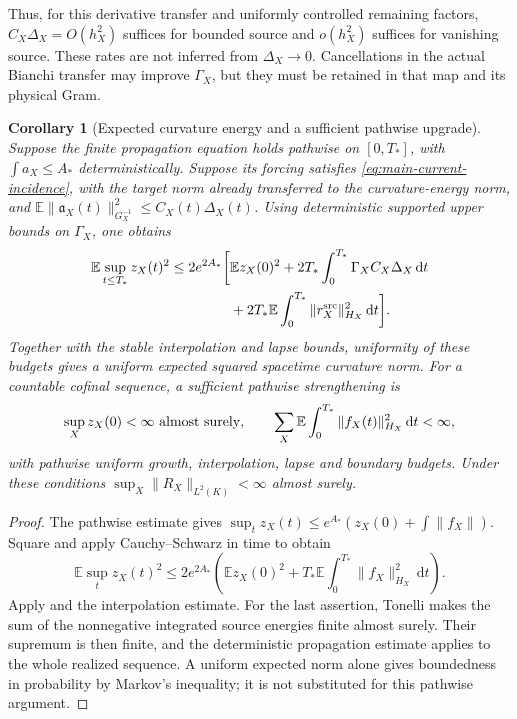 \documentclass[11pt]{article}
\numberwithin{equation}{section}
\newtheorem{corollary}[corollary]{Corollary}
\theoremstyle{definition}
\theoremstyle{remark}
\newcommand{\dd}{\mathrm d}
\begin{document}
Thus, for this derivative transfer and uniformly controlled remaining
factors, $C_X\Delta_X=O(h_X^2)$ suffices for bounded source and
$o(h_X^2)$ suffices for vanishing source.  These rates are not inferred from
$\Delta_X\to0$.  Cancellations in the actual Bianchi transfer may improve
$\Gamma_X$, but they must be retained in that map and its physical Gram.

\begin{corollary}[Expected curvature energy and a sufficient pathwise upgrade]
\label{cor:supp-stochastic-curvature}
Suppose the finite propagation equation holds pathwise on $[0,T_*]$, with
$\int a_X\le A_*$ deterministically.  Suppose its forcing satisfies
\eqref{eq:main-current-incidence}, with the target norm already transferred
to the curvature-energy norm, and
$\mathbb E\|\mathfrak a_X(t)\|_{G_X^{-1}}^2\le C_X(t)\Delta_X(t)$.
Using deterministic supported upper bounds on $\Gamma_X$, one obtains
\begin{equation}
 \begin{split}
 \mathbb E\sup_{t\le T_*}z_X(t)^2
 \le 2e^{2A_*}\bigg[&\mathbb Ez_X(0)^2
       +2T_*\int_0^{T_*}\Gamma_XC_X\Delta_X\,\dd t\\
       &+2T_*\mathbb E\int_0^{T_*}\|r_X^{\rm src}\|_{H_X}^2\,\dd t\bigg].
 \end{split}
 \label{eq:supp-expected-curvature}
\end{equation}
Together with the stable interpolation and lapse bounds, uniformity of these
budgets gives a uniform expected squared spacetime curvature norm.  For a
countable cofinal sequence, a sufficient pathwise strengthening is
\begin{equation}
 \sup_Xz_X(0)<\infty\ \hbox{almost surely},\qquad
 \sum_X\mathbb E\int_0^{T_*}\|f_X(t)\|_{H_X}^2\,\dd t<\infty,
 \label{eq:supp-pathwise-source-budget}
\end{equation}
with pathwise uniform growth, interpolation, lapse and boundary budgets.
Under these conditions $\sup_X\|R_X\|_{L^2(K)}<\infty$ almost surely.
\end{corollary}
\begin{proof}
The pathwise estimate gives
$\sup_tz_X(t)\le e^{A_*}(z_X(0)+\int\|f_X\|)$.
Square and apply Cauchy--Schwarz in time to obtain
\[
 \mathbb E\sup_tz_X(t)^2
 \le2e^{2A_*}\left(\mathbb Ez_X(0)^2
       +T_*\mathbb E\int_0^{T_*}\|f_X\|_{H_X}^2\,\dd t\right).
\]
Apply  and the interpolation estimate.
For the last assertion, Tonelli makes the sum of the nonnegative integrated
source energies finite almost surely.  Their supremum is then finite, and
the deterministic propagation estimate applies to the whole realized
sequence.  A uniform expected norm alone gives boundedness in probability
by Markov's inequality; it is not substituted for this pathwise argument.
\end{proof}
\end{document}
